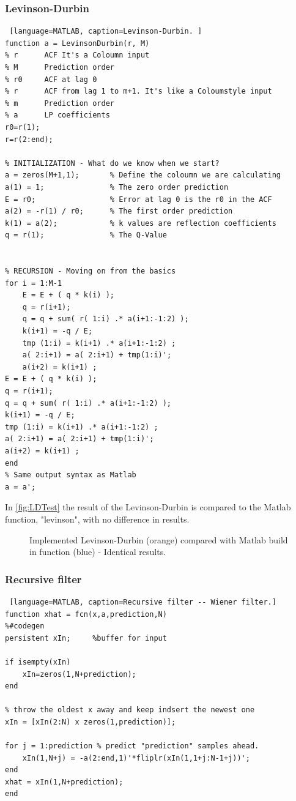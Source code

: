 \subsubsection{Levinson-Durbin}
\begin{lstlisting} [language=MATLAB, caption=Levinson-Durbin. ]
function a = LevinsonDurbin(r, M)
% r      ACF It's a Coloumn input
% M      Prediction order
% r0     ACF at lag 0
% r      ACF from lag 1 to m+1. It's like a Coloumstyle input
% m      Prediction order
% a      LP coefficients
r0=r(1);
r=r(2:end);

% INITIALIZATION - What do we know when we start?
a = zeros(M+1,1);       % Define the coloumn we are calculating
a(1) = 1;               % The zero order prediction
E = r0;                 % Error at lag 0 is the r0 in the ACF
a(2) = -r(1) / r0;      % The first order prediction
k(1) = a(2);            % k values are reflection coefficients
q = r(1);               % The Q-Value


% RECURSION - Moving on from the basics
for i = 1:M-1
	E = E + ( q * k(i) );                   
	q = r(i+1);
	q = q + sum( r( 1:i) .* a(i+1:-1:2) );
	k(i+1) = -q / E;
	tmp (1:i) = k(i+1) .* a(i+1:-1:2) ;
	a( 2:i+1) = a( 2:i+1) + tmp(1:i)';
	a(i+2) = k(i+1) ;
E = E + ( q * k(i) );                   
q = r(i+1);
q = q + sum( r( 1:i) .* a(i+1:-1:2) );
k(i+1) = -q / E;
tmp (1:i) = k(i+1) .* a(i+1:-1:2) ;
a( 2:i+1) = a( 2:i+1) + tmp(1:i)';
a(i+2) = k(i+1) ;
end
% Same output syntax as Matlab
a = a';
\end{lstlisting}
In \autoref{fig:LDTest} the result of the Levinson-Durbin is compared to the Matlab function, "levinson", with no difference in results.   
\begin{figure}[H]
	\centering
	
	\caption{Implemented Levinson-Durbin (orange) compared with Matlab build in function (blue) - Identical results.}
	\label{fig:LDTest}
\end{figure}

\subsubsection{Recursive filter}
\begin{lstlisting} [language=MATLAB, caption=Recursive filter -- Wiener filter.]
function xhat = fcn(x,a,prediction,N)
%#codegen
persistent xIn;     %buffer for input

if isempty(xIn)
	xIn=zeros(1,N+prediction);
end

% throw the oldest x away and keep indsert the newest one
xIn = [xIn(2:N) x zeros(1,prediction)]; 

for j = 1:prediction % predict "prediction" samples ahead. 
	xIn(1,N+j) = -a(2:end,1)'*fliplr(xIn(1,1+j:N-1+j))';
end
xhat = xIn(1,N+prediction);
end
\end{lstlisting}

